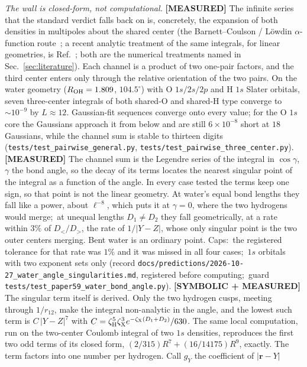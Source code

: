 \documentclass[aps,pra,twocolumn,superscriptaddress,longbibliography]{revtex4-2}
\begin{document}
\emph{The wall is closed-form, not computational.}  \textbf{[MEASURED]} The
infinite series that the standard verdict falls back on is, concretely, the
expansion of both densities in multipoles about the shared center (the
Barnett--Coulson / L\"owdin $\alpha$-function route~\cite{barnett_coulson1951};
a recent analytic treatment of the same integrals, for linear
geometries, is Ref.~\cite{ozdogan2012}; both are the numerical treatments
named in Sec.~\ref{sec:literature}).  Each channel is a product of two
one-pair factors, and the third center enters only through the relative
orientation of the two pairs.  On the water geometry
($R_{\rm OH} = 1.809$, $104.5^\circ$) with O $1s/2s/2p$ and H $1s$ Slater
orbitals, seven three-center integrals of both shared-O and shared-H type
converge to $\sim\!10^{-9}$ by $L \approx 12$.  Gaussian-fit sequences
converge onto every value; for the O $1s$ core the Gaussians approach it from
below and are still $6\times10^{-8}$ short at $18$ Gaussians, while the
channel sum is stable to thirteen digits
(\texttt{tests/test\_pairwise\_general.py},
\texttt{tests/test\_pairwise\_three\_center.py}).  \textbf{[MEASURED]} The channel sum
is the Legendre series of the integral in $\cos\gamma$, $\gamma$ the bond angle, so the decay
of its terms locates the nearest singular point of the integral as a function of the angle.
In every case tested the terms keep one sign, so that point is not the linear geometry.  At
water's equal bond lengths they fall like a power, about $\ell^{-8}$, which puts it at
$\gamma=0$, where the two hydrogens would merge;\ at unequal lengths $D_1\neq D_2$ they fall
geometrically, at a rate within $3\%$ of $D_</D_>$, the rate of $1/|Y-Z|$, whose only
singular point is the two outer centers merging.  Bent water is an ordinary point.
Caps:\ the registered tolerance for that rate was $1\%$ and it was missed in all four cases;\
$1s$ orbitals with two exponent sets only (record
\texttt{docs/predictions/2026-10-27\_water\_angle\_singularities.md}, registered before
computing;\ guard \texttt{tests/test\_paper59\_water\_bond\_angle.py}).
\textbf{[SYMBOLIC + MEASURED]} The singular term itself is derived.  Only the two hydrogen
cusps, meeting through $1/r_{12}$, make the integral non-analytic in the angle, and the lowest
such term is $C\,|Y-Z|^{7}$ with $C=\zeta_{\rm H}^{5}\zeta_{\rm X}^{3}e^{-\zeta_{\rm X}(D_1+D_2)}/630$.
The same local computation, run on the two-center Coulomb integral of two $1s$ densities,
reproduces the first two odd terms of its closed form, $(2/315)R^{7}+(16/14175)R^{9}$, exactly.
The term factors into one number per hydrogen.  Call $g_Y$ the coefficient of $|\mathbf{r}-Y|$
\end{document}
